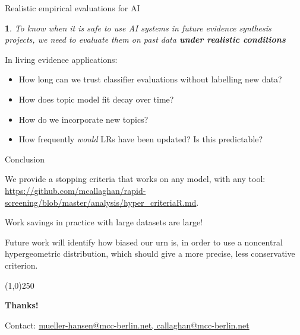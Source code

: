 \documentclass[9pt,aspectratio=169]{beamer}
\newtheorem*{remark}{}
\begin{document}
\begin{frame}{Realistic empirical evaluations for AI}

\begin{remark}
	To know when it is safe to use AI systems in future evidence synthesis projects, we need to evaluate them on past data \textbf{under realistic conditions}
\end{remark}

In living evidence applications:

\begin{itemize}
	\item<2-> How long can we trust classifier evaluations without labelling new data?
	\item<3-> How does topic model fit decay over time?
	\item<4-> How do we incorporate new topics?
	\item<4-> How frequently \textit{would} LRs have been updated? Is this predictable?
\end{itemize}

\end{frame}


\begin{frame}{Conclusion}

We provide a stopping criteria that works on any model, with any tool: \url{https://github.com/mcallaghan/rapid-screening/blob/master/analysis/hyper_criteriaR.md}.

\medskip

Work savings in practice with large datasets are large!

\medskip

Future work will identify how biased our urn is, in order to use a noncentral hypergeometric distribution, which should give a more precise, less conservative criterion.

\begin{center}
	\line(1,0){250}
	
	\medskip
	
	\textbf{Thanks!}
	
	\medskip
	
	Contact: \url{mueller-hansen@mcc-berlin.net, callaghan@mcc-berlin.net}
	
\end{center}

\end{frame}


\appendix
\end{document}
